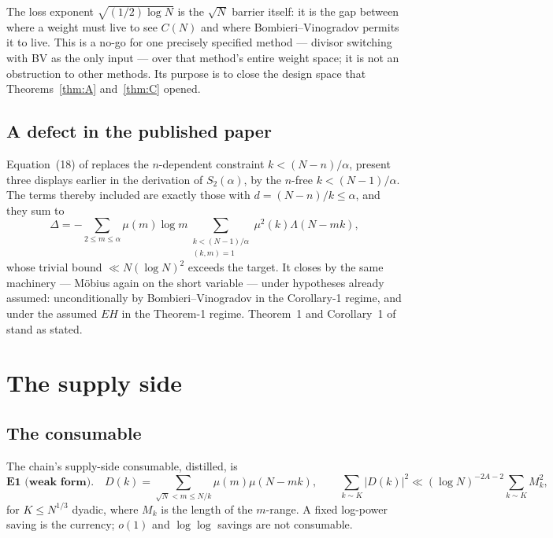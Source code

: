 \documentclass[11pt,a4paper]{article}
\theoremstyle{plain}
\theoremstyle{definition}
\begin{document}
The loss exponent $\sqrt{(1/2)\log N}$ is the $\sqrt N$ barrier itself:
it is the gap between where a weight must live to see $C(N)$ and where
Bombieri--Vinogradov permits it to live. This is a no-go for one
precisely specified method --- divisor switching with BV as the only
input --- over that method's entire weight space; it is not an
obstruction to other methods. Its purpose is to close the design space
that Theorems~\ref{thm:A} and~\ref{thm:C} opened.

\subsection{A defect in the published paper}

Equation~(18) of \cite{HL} replaces the $n$-dependent constraint
$k < (N-n)/\alpha$, present three displays earlier in the derivation of
$S_2(\alpha)$, by the $n$-free $k < (N-1)/\alpha$. The terms thereby
included are exactly those with $d=(N-n)/k \le \alpha$, and they sum to
\[
  \Delta = -\sum_{2\le m\le\alpha}\mu(m)\log m
    \sum_{\substack{k<(N-1)/\alpha\\ (k,m)=1}}\mu^2(k)\Lambda(N-mk),
\]
whose trivial bound $\ll N(\log N)^2$ exceeds the target. It closes by
the same machinery --- M\"obius again on the short variable --- under
hypotheses already assumed: unconditionally by Bombieri--Vinogradov in
the Corollary-1 regime, and under the assumed $EH$ in the Theorem-1
regime. Theorem~1 and Corollary~1 of \cite{HL} stand as stated.

\section{The supply side}\label{sec:supply}

\subsection{The consumable}

The chain's supply-side consumable, distilled, is
\[
  \textbf{E1 (weak form).}\quad
  D(k) = \!\!\sum_{\sqrt N < m \le N/k}\!\! \mu(m)\mu(N-mk),
  \qquad
  \sum_{k\sim K}|D(k)|^2 \ll (\log N)^{-2A-2}\sum_{k\sim K} M_k^2,
\]
for $K \le N^{1/3}$ dyadic, where $M_k$ is the length of the $m$-range.
A fixed log-power saving is the currency; $o(1)$ and $\log\log$ savings
are not consumable.
\end{document}
